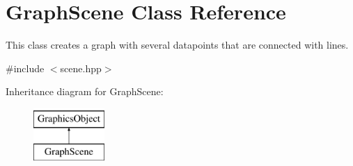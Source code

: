\hypertarget{class_graph_scene}{}\section{Graph\+Scene Class Reference}
\label{class_graph_scene}


This class creates a graph with several datapoints that are connected with lines.  




{\ttfamily \#include $<$scene.\+hpp$>$}

Inheritance diagram for Graph\+Scene\+:\begin{figure}[H]
\begin{center}
\leavevmode
\includegraphics[height=2.000000cm]{class_graph_scene}
\end{center}
\end{figure}
